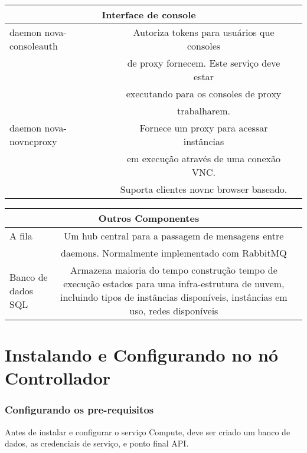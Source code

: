 \begin{tabular}{|l||c|c|}
\hline
\multicolumn{2}{|c|}{Interface de console} \\
\hline \hline
daemon nova-consoleauth& Autoriza tokens para usuários que consoles\\& de proxy fornecem. Este serviço deve estar\\& executando para os consoles de proxy\\& trabalharem.\\
\hline \hline

daemon nova-novncproxy& Fornece um proxy para acessar instâncias\\& em execução através de uma conexão VNC.\\& Suporta clientes novnc browser baseado.\\
\hline
\end{tabular}

\begin{tabular}{|l||c|c|}
\hline
\multicolumn{2}{|c|}{Outros Componentes} \\
\hline \hline
A fila& Um hub central para a passagem de mensagens entre\\& daemons. Normalmente implementado com RabbitMQ \\
\hline \hline

Banco de dados SQL& Armazena maioria do tempo construção tempo de execução estados para uma infra-estrutura de nuvem, incluindo tipos de instâncias disponíveis, instâncias em uso, redes disponíveis
\end{tabular}

\section{Instalando e Configurando no nó Controllador}
\subsubsection{Configurando os pre-requisitos}
Antes de instalar e configurar o serviço Compute, deve ser criado um banco de dados, as credenciais de serviço, e ponto final API.

